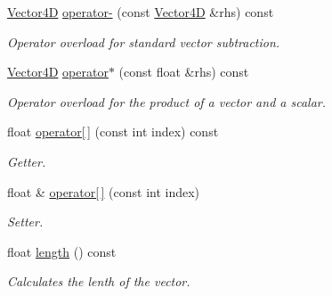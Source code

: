 \begin{DoxyCompactItemize}
\mbox{\label{class_vector4_d_a85732c0605aa87a71f25a8018bfaf0db}} 
\mbox{\hyperlink{class_vector4_d}{Vector4D}} \mbox{\hyperlink{class_vector4_d_a85732c0605aa87a71f25a8018bfaf0db}{operator-\/}} (const \mbox{\hyperlink{class_vector4_d}{Vector4D}} \&rhs) const
\begin{DoxyCompactList}\small\item\em Operator overload for standard vector subtraction. \end{DoxyCompactList}\item 
\mbox{\label{class_vector4_d_a50b6e9caa77091c0cd8523a73df371bc}} 
\mbox{\hyperlink{class_vector4_d}{Vector4D}} \mbox{\hyperlink{class_vector4_d_a50b6e9caa77091c0cd8523a73df371bc}{operator$\ast$}} (const float \&rhs) const
\begin{DoxyCompactList}\small\item\em Operator overload for the product of a vector and a scalar. \end{DoxyCompactList}\item 
\mbox{\label{class_vector4_d_aa702ee856ea4e3b6f48e7df9d966102d}} 
float \mbox{\hyperlink{class_vector4_d_aa702ee856ea4e3b6f48e7df9d966102d}{operator\mbox{[}$\,$\mbox{]}}} (const int index) const
\begin{DoxyCompactList}\small\item\em Getter. \end{DoxyCompactList}\item 
\mbox{\label{class_vector4_d_a019403cfb7ea761983c0548fae5509a7}} 
float \& \mbox{\hyperlink{class_vector4_d_a019403cfb7ea761983c0548fae5509a7}{operator\mbox{[}$\,$\mbox{]}}} (const int index)
\begin{DoxyCompactList}\small\item\em Setter. \end{DoxyCompactList}\item 
\mbox{\label{class_vector4_d_ae43dfa6eed13c50019c17b6f324aff0c}} 
float \mbox{\hyperlink{class_vector4_d_ae43dfa6eed13c50019c17b6f324aff0c}{length}} () const
\begin{DoxyCompactList}\small\item\em Calculates the lenth of the vector. \end{DoxyCompactList}\item 

\end{DoxyCompactItemize}
